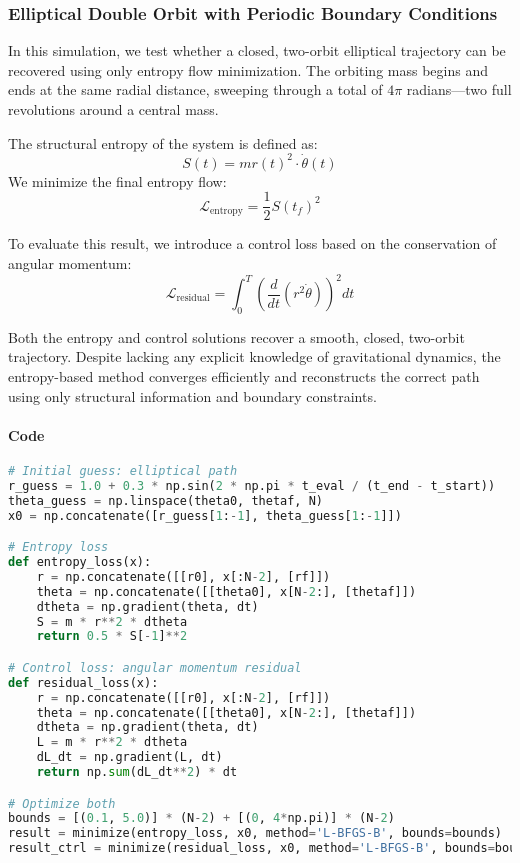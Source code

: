 \documentclass[12pt]{article}
\begin{document}
\subsubsection{Elliptical Double Orbit with Periodic Boundary Conditions}

In this simulation, we test whether a closed, two-orbit elliptical trajectory can be recovered using only entropy flow minimization. The orbiting mass begins and ends at the same radial distance, sweeping through a total of \(4\pi\) radians—two full revolutions around a central mass.

The structural entropy of the system is defined as:
\[
S(t) = m r(t)^2 \cdot \dot{\theta}(t)
\]
We minimize the final entropy flow:
\[
\mathcal{L}_{\text{entropy}} = \frac{1}{2} S(t_f)^2
\]

To evaluate this result, we introduce a control loss based on the conservation of angular momentum:
\[
\mathcal{L}_{\text{residual}} = \int_0^T \left( \frac{d}{dt}(r^2 \dot{\theta}) \right)^2 dt
\]

Both the entropy and control solutions recover a smooth, closed, two-orbit trajectory. Despite lacking any explicit knowledge of gravitational dynamics, the entropy-based method converges efficiently and reconstructs the correct path using only structural information and boundary constraints.

\paragraph*{Code}\mbox{}
\begin{lstlisting}[language=Python]
# Initial guess: elliptical path
r_guess = 1.0 + 0.3 * np.sin(2 * np.pi * t_eval / (t_end - t_start))
theta_guess = np.linspace(theta0, thetaf, N)
x0 = np.concatenate([r_guess[1:-1], theta_guess[1:-1]])

# Entropy loss
def entropy_loss(x):
    r = np.concatenate([[r0], x[:N-2], [rf]])
    theta = np.concatenate([[theta0], x[N-2:], [thetaf]])
    dtheta = np.gradient(theta, dt)
    S = m * r**2 * dtheta
    return 0.5 * S[-1]**2

# Control loss: angular momentum residual
def residual_loss(x):
    r = np.concatenate([[r0], x[:N-2], [rf]])
    theta = np.concatenate([[theta0], x[N-2:], [thetaf]])
    dtheta = np.gradient(theta, dt)
    L = m * r**2 * dtheta
    dL_dt = np.gradient(L, dt)
    return np.sum(dL_dt**2) * dt

# Optimize both
bounds = [(0.1, 5.0)] * (N-2) + [(0, 4*np.pi)] * (N-2)
result = minimize(entropy_loss, x0, method='L-BFGS-B', bounds=bounds)
result_ctrl = minimize(residual_loss, x0, method='L-BFGS-B', bounds=bounds)
\end{lstlisting}
\end{document}
